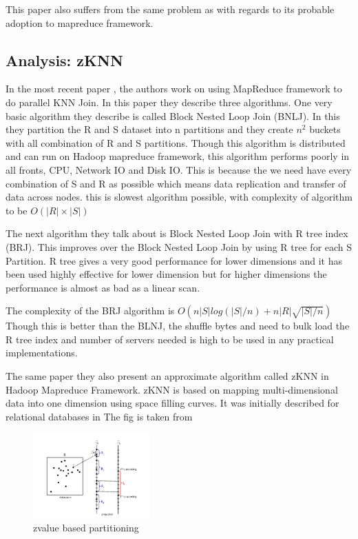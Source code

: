 \documentclass[conference]{IEEEtran}
\begin{document}
\medskip

This paper also suffers from the same problem as
\cite{yu_efficient_2007} with regards to its probable adoption to
mapreduce framework.

\bigskip
\subsection{Analysis: zKNN}
In the most recent paper \cite{zhang_efficient_2012}, the authors work on using
MapReduce framework to do parallel KNN Join. In this paper they
describe three algorithms. One very basic algorithm they describe is
called Block Nested Loop Join (BNLJ). In this they partition the R and S
dataset into n partitions and they create $n^2$ buckets
with all combination of R and S partitions. Though this algorithm is
distributed and can run on Hadoop mapreduce framework, this algorithm
performs poorly in all fronts, CPU, Network IO and Disk IO. This is
because the we need have every combination of S and R as possible
which means data replication and transfer of data across nodes. this
is slowest algorithm possible, with complexity of algorithm to be
$O(|R| \times |S|)$

\bigskip

The next algorithm they talk about is Block Nested Loop Join with R
tree index (BRJ). This improves over the Block Nested Loop Join by using R
tree for each S Partition. R tree gives a very good performance for
lower dimensions and it has been used highly effective for lower
dimension \cite{kuan_fast_1997} but for higher dimensions the
performance is almost as bad as a linear scan.

\medskip

The complexity of the BRJ algorithm is $O(n|S|log(|S|/n) + n|R|\sqrt{|S|/n})$
Though this is better than the BLNJ,
the shuffle bytes and need to bulk load the R tree index and number of
servers needed is high to be used in any practical implementations.

\bigskip

The same paper they also present an approximate algorithm called zKNN
in Hadoop Mapreduce Framework. zKNN is based on mapping
multi-dimensional data into one dimension using space filling
curves. It was initially described for relational databases in \cite{yao_k_2010}
The fig is taken from \cite{song_solutions_2015}

\begin{figure}[here]
\includegraphics[width=0.4\textwidth]{zknn.png}
\caption{zvalue based partitioning}
\label{fig:zknn.png}
\end{figure}
\end{document}
